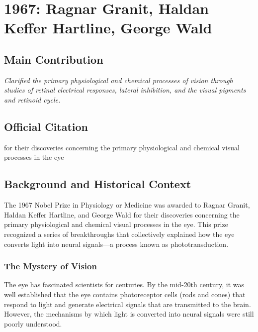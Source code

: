 \chapter[1967 --- Granit et al.]{1967: Ragnar Granit, Haldan Keffer Hartline, George Wald}
\label{ch:1967_Granit}

\section*{Main Contribution}

\textit{Clarified the primary physiological and chemical processes of vision through studies of retinal electrical responses, lateral inhibition, and the visual pigments and retinoid cycle.}\cite{nobel-1967,lecture-1967,lecture-hartline-1967,lecture-wald-1967}

\section{Official Citation}

for their discoveries concerning the primary physiological and chemical visual processes in the eye

\section{Background and Historical Context}

The 1967 Nobel Prize in Physiology or Medicine was awarded to Ragnar Granit, Haldan Keffer Hartline, and George Wald for their discoveries concerning the primary physiological and chemical visual processes in the eye. This prize recognized a series of breakthroughs that collectively explained how the eye converts light into neural signals---a process known as phototransduction.

\subsection{The Mystery of Vision}

The eye has fascinated scientists for centuries. By the mid-20th century, it was well established that the eye contains photoreceptor cells (rods and cones) that respond to light and generate electrical signals that are transmitted to the brain. However, the mechanisms by which light is converted into neural signals were still poorly understood.

